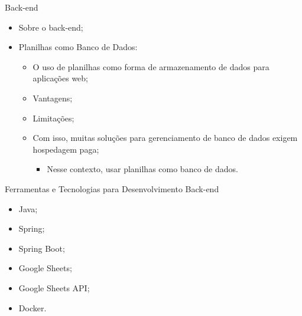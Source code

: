 \begin{frame}{Back-end}
    \begin{itemize}
        \item Sobre o back-end; \vspace{0.25cm}
        \item Planilhas como Banco de Dados: \vspace{0.25cm}
              \begin{itemize}
                  \item O uso de planilhas como forma de armazenamento de dados para aplicações web; \vspace{0.25cm}
                  \item Vantagens; \vspace{0.25cm}
                  \item Limitações; \vspace{0.25cm}
                  \item Com isso, muitas soluções para gerenciamento de banco de dados exigem hospedagem paga; \vspace{0.25cm}
                  \begin{itemize}
                    \item Nesse contexto, usar planilhas como banco de dados.
                  \end{itemize}
              \end{itemize}
    \end{itemize}
\end{frame}

\begin{frame}{Ferramentas e Tecnologias para Desenvolvimento Back-end}
    \begin{itemize}
        \item Java; \vspace{0.5cm}
        \item Spring; \vspace{0.5cm}
        \item Spring Boot; \vspace{0.5cm}
        \item Google Sheets; \vspace{0.5cm}
        \item Google Sheets API; \vspace{0.5cm}
        \item Docker. \vspace{0.5cm}
    \end{itemize}
\end{frame}

